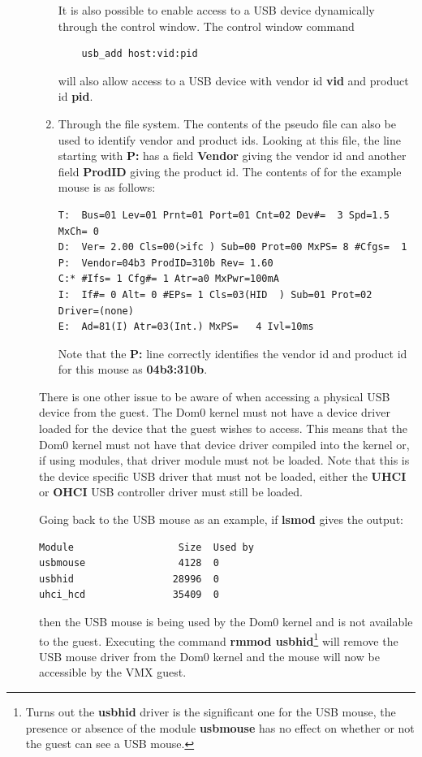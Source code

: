 \documentclass[11pt,twoside,final,openright]{report}
\begin{document}
\begin{description}
\begin{enumerate}
It is also possible to
enable access to a USB
device dynamically through
the control window.
The control window command
{\small
\begin{verbatim}
    usb_add host:vid:pid
\end{verbatim}
}
will also allow access to a
USB device with vendor id
\textbf{vid}
and product id
\textbf{pid}.
\item Through the
 file system.
The contents of the pseudo file
can also be used to identify
vendor and product ids.
Looking at this file,
the line starting with
\textbf{P:}
has a field
\textbf{Vendor}
giving the vendor id and
another field
\textbf{ProdID}
giving the product id.
The contents of
for the example mouse is as
follows:
{\small
\begin{verbatim}
T:  Bus=01 Lev=01 Prnt=01 Port=01 Cnt=02 Dev#=  3 Spd=1.5 MxCh= 0
D:  Ver= 2.00 Cls=00(>ifc ) Sub=00 Prot=00 MxPS= 8 #Cfgs=  1
P:  Vendor=04b3 ProdID=310b Rev= 1.60
C:* #Ifs= 1 Cfg#= 1 Atr=a0 MxPwr=100mA
I:  If#= 0 Alt= 0 #EPs= 1 Cls=03(HID  ) Sub=01 Prot=02 Driver=(none)
E:  Ad=81(I) Atr=03(Int.) MxPS=   4 Ivl=10ms
\end{verbatim}
}
Note that the
\textbf{P:}
line correctly identifies the
vendor id and product id
for this mouse as
\textbf{04b3:310b}.
\end{enumerate}
There is one other issue to
be aware of when accessing a
physical USB device from the guest.
The Dom0 kernel must not have
a device driver loaded for
the device that the guest wishes
to access.
This means that the Dom0
kernel must not have that
device driver compiled into
the kernel or,
if using modules,
that driver module must
not be loaded.
Note that this is the device
specific USB driver that must
not be loaded,
either the
\textbf{UHCI}
or
\textbf{OHCI}
USB controller driver must
still be loaded.

Going back to the USB mouse
as an example,
if \textbf{lsmod}
gives the output:

{\small
\begin{verbatim}
Module                  Size  Used by
usbmouse                4128  0 
usbhid                 28996  0
uhci_hcd               35409  0
\end{verbatim}
}

then the USB mouse is being
used by the Dom0 kernel and is
not available to the guest.
Executing the command
\textbf{rmmod usbhid}\footnote{
Turns out the
\textbf{usbhid}
driver is the significant
one for the USB mouse,
the presence or absence of
the module
\textbf{usbmouse}
has no effect on whether or
not the guest can see a USB mouse.}
will remove the USB mouse
driver from the Dom0 kernel
and the mouse will now be
accessible by the VMX guest.


\end{description}
\end{document}
